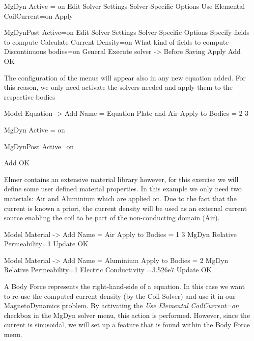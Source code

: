      MgDyn
         Active = on
         Edit Solver Settings
             Solver Specific Options
                 Use Elemental CoilCurrent=on
             Apply
         
     MgDynPost
         Active=on
         Edit Solver Settings
             Solver Specific Options
                 Specify fields to compute
                     Calculate Current Density=on
                 What kind of fields to compute
                     Discontinuous bodies=on
             General
                 Execute solver -> Before Saving
              Apply
    Add 
    OK
\ttend       


\clearpage
The configuration of the menus will appear also in any new equation added.  For this reason,  we only need activate the solvers needed and apply them to the respective bodies

\ttbegin
Model
  Equation -> Add
     Name = Equation Plate and Air
     Apply to Bodies = 2 3
     
     MgDyn
         Active = on
         
     MgDynPost
         Active=on
         
    Add 
    OK
\ttend  

 
Elmer contains an extensive material library however, for this exercise we will define some user defined material properties.  In this example we only need two materials: Air and Aluminium which are applied on. Due to the fact that the current is known a priori, the current density will be used as an external current source enabling the coil to be part of the non-conducting domain (Air).

\ttbegin
Model
  Material -> Add
      Name = Air
      Apply to Bodies = 1 3
      MgDyn
          Relative Permeability=1
    Update
    OK
\ttend


\ttbegin
Model
  Material -> Add
      Name = Aluminium
      Apply to Bodies = 2
      MgDyn
          Relative Permeability=1
          Electric Conductivity =3.526e7
    Update
    OK
\ttend

A Body Force represents the right-hand-side of a equation.  In this case we want to re-use the computed current density (by the Coil Solver) and use it in our MagnetoDynamics problem. By activating the \textit{ Use Elemental CoilCurrent=on} checkbox in the MgDyn solver menu, this action is performed.  However, since the current is sinusoidal, we will set up a feature that is found within the Body Force menu. 



